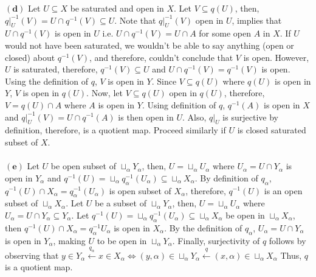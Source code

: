 \documentclass{article}
\begin{document}
$\mathbf{(d)}$ Let $U \subseteq X$ be saturated and open in $X$. Let $V \subseteq q(U)$, then, $q\big\vert_{U}^{-1}(V) = U \cap q^{-1}(V) \subseteq U$. Note that $q\big\vert_{U}^{-1}(V)$ open in $U$, implies that $U \cap q^{-1}(V)$ is open in $U$ i.e. $U \cap q^{-1}(V) = U \cap A$ for some open $A$ in $X$. If $U$ would not have been saturated, we wouldn't be able to say anything (open or closed) about $q^{-1}(V)$, and therefore, couldn't conclude that $V$ is open. However, $U$ is saturated, therefore, $q^{-1}(V) \subseteq U$ and $U \cap q^{-1}(V) = q^{-1}(V)$ is open. Using the definition of $q$, $V$ is open in $Y$. Since $V\subseteq q(U)$ where $q(U)$ is open in $Y$, $V$ is open in $q(U)$. Now, let $V \subseteq q(U)$ open in $q(U)$, therefore, $V = q(U) \cap A$ where $A$ is open in $Y$. Using definition of $q$, $q^{-1}(A)$ is open in $X$ and  $q\big\vert_{U}^{-1}(V) = U \cap q^{-1}(A)$ is then open in $U$. Also, $q\big\vert_{U}$ is surjective by definition, therefore, is a quotient map. Proceed similarly if $U$ is closed saturated subset of $X$.\\~\\

$\mathbf{(e)}$ Let $U$ be open subset of $\sqcup_{\alpha}Y_{\alpha}$, then, $U = \sqcup_{\alpha}U_{\alpha}$ where $U_\alpha = U \cap Y_{\alpha}$ is open in $Y_{\alpha}$ and $q^{-1}(U) = \sqcup_{\alpha}q_{\alpha}^{-1}(U_{\alpha}) \subseteq \sqcup_{\alpha}X_{\alpha}$. By definition of $q_{\alpha}$, $q^{-1}(U) \cap X_{\alpha} = q_{\alpha}^{-1}(U_{\alpha})$ is open subset of $X_{\alpha}$, therefore, $q^{-1}(U)$ is an open subset of $\sqcup_{\alpha}X_{\alpha}$. Let $U$ be a subset of $\sqcup_{\alpha}Y_{\alpha}$, then, $U = \sqcup_{\alpha}U_{\alpha}$ where $U_\alpha = U \cap Y_{\alpha} \subseteq Y_{\alpha}$. Let $q^{-1}(U) = \sqcup_{\alpha}q_{\alpha}^{-1}(U_{\alpha}) \subseteq \sqcup_{\alpha}X_{\alpha}$ be open in $\sqcup_{\alpha}X_{\alpha}$, then $q^{-1}(U) \cap X_{\alpha} = q_{\alpha}^{-1}U_{\alpha}$ is open in $X_{\alpha}$. By the definition of $q_{\alpha}$, $U_{\alpha} = U \cap Y_{\alpha}$ is open in $Y_{\alpha}$, making $U$ to be open in $\sqcup_{\alpha}Y_{\alpha}$. Finally, surjectivity of $q$ follows by observing that $y \in Y_{\alpha} \xleftarrow{q_{\alpha}} x \in X_{\alpha} \iff (y,\alpha) \in \sqcup_{\alpha}Y_{\alpha} \xleftarrow{q} (x,\alpha) \in \sqcup_{\alpha}X_{\alpha}$ Thus, $q$ is a quotient map.



\vspace{0.2in}
\end{document}
